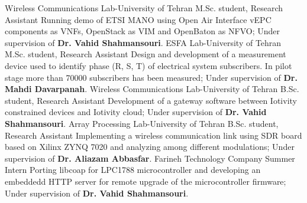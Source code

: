 {}
{Wireless Communications Lab-University of Tehran}
{M.Sc. student, Research Assistant}
{
  Running demo of ETSI MANO using Open Air Interface vEPC components as VNFs, OpenStack as VIM and OpenBaton as NFVO;
  Under supervision of \textbf{Dr. Vahid Shahmansouri}.
}
\medskip
{}
{}
{ESFA Lab-University of Tehran}
{M.Sc. student, Research Assistant}
{
  Design and development of a measurement device used to identify phase (R, S, T) of electrical system subscribers.
  In pilot stage more than 70000 subscribers has been measured;
  Under supervision of \textbf{Dr. Mahdi Davarpanah}.
}
\medskip
{}
{}
{Wireless Communications Lab-University of Tehran}
{B.Sc. student, Research Assistant}
{
  Development of a gateway software between Iotivity constrained devices and Iotivity cloud;
  Under supervision of \textbf{Dr. Vahid Shahmansouri}.
}
\medskip
{}
{}
{Array Processing Lab-University of Tehran}
{B.Sc. student, Research Assistant}
{
  Implementing a wireless communication link using SDR board based on Xilinx ZYNQ 7020 and analyzing among different modulations;
  Under supervision of \textbf{Dr. Aliazam Abbasfar}.
}
\medskip
{}
{}
{Farineh Technology Company}
{Summer Intern}
{
  Porting libcoap for LPC1788 microcontroller and developing an embeddedd HTTP server for remote upgrade of the microcontroller firmware;
  Under supervision of \textbf{Dr. Vahid Shahmansouri}.
}
\medskip
